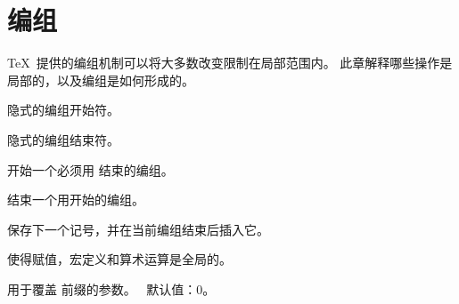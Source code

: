 \documentclass[letterpaper]{book}
\begin{document}
\chapter{编组}\label{group}

\TeX\ 提供的编组机制可以将大多数改变限制在局部范围内。
此章解释哪些操作是局部的，以及编组是如何形成的。

\label{cschap:bgroup}\label{cschap:egroup}\label{cschap:begingroup}\label{cschap:endgroup}%
\label{cschap:aftergroup}\label{cschap:global}\label{cschap:globaldefs}
\begin{inventory}
\item [\cs{bgroup}] 
隐式的编组开始符。
\item [\cs{egroup}] 
隐式的编组结束符。
\item [\cs{begingroup}] 
开始一个必须用  结束的编组。
\item [\cs{endgroup}] 
结束一个用开始的编组。
\item [\cs{aftergroup}] 
保存下一个记号，并在当前编组结束后插入它。
\item [\cs{global}] 
使得赋值，宏定义和算术运算是全局的。
\item [\cs{globaldefs}] 
用于覆盖  前缀的参数。
\IniTeX\ 默认值：0。
\end{inventory}
\end{document}
